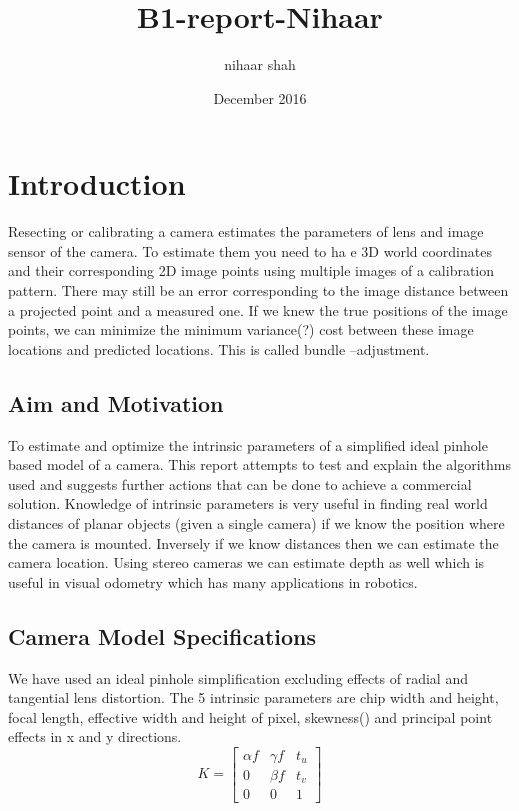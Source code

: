 \documentclass[titlepage]{article}
\title{B1-report-Nihaar}
\author{nihaar shah }
\date{December 2016}
\begin{document}
\maketitle
\section{Introduction}
Resecting or calibrating a camera estimates the parameters of lens and image sensor of the camera. To estimate them you need to ha e 3D world coordinates and their corresponding 2D image points using multiple images of a calibration pattern. There may still be an error corresponding to the image distance between a projected point and a measured one. If we knew the true positions of the image points, we can minimize the minimum variance(?) cost between these image locations and predicted locations. This is called bundle –adjustment.
\subsection{Aim and Motivation}
To estimate and optimize the intrinsic parameters of a simplified ideal pinhole based model of a camera. This report attempts to test and explain the algorithms used and suggests further actions that can be done to achieve a commercial solution.
Knowledge of intrinsic parameters is very useful in finding real world distances of planar objects (given a single camera) if we know the position where the camera is mounted. Inversely if we know distances then we can estimate the camera location. Using stereo cameras we can estimate depth as well which is useful in visual odometry which has many applications in robotics.
\subsection{Camera Model Specifications}
We have used an ideal pinhole simplification excluding effects of radial and tangential lens distortion. The 5 intrinsic parameters are chip width and height, focal length, effective width and height of pixel, skewness(\alpha) and principal point effects in x and y directions.
%
\begin{equation} \label{KMatrix}
K=
  \begin{bmatrix}
  \alpha f & \gamma f & t_u \\ 
  0        & \beta f  & t_v \\ 
  0        &    0     &  1 
  \end{bmatrix}
\end{equation}
\end{document}
